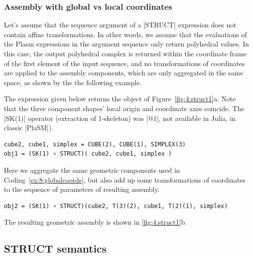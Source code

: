 \begin{coding}
\subsubsection*{Assembly with global vs local coordinates}

Let’s assume that the sequence argument of a |STRUCT| expression
does not contain affine transformations. In other words, we assume
that the evaluations of the Plasm expressions in the argument sequence
only return polyhedral values.
In this case, the output polyhedral complex is returned within the
coordinate frame of the first element of the input sequence, and no
transformations of coordinates are applied to the assembly components,
which are only aggregated in the same space, as shown by the
the following example.

\begin{coding}
The expression given below returns the
object of Figure~\ref{fig:4:struct1}a.  Note that the
three component shapes' local origin and coordinate axes
coincide.  The |SK(1)| operator (extraction of 1-skeleton)
was |$@1$|, not available in Julia, in classic |PlaSM|).
    
\begin{lstlisting}[language=JuliaLocal, style=julia, mathescape=true]
cube2, cube1, simplex = CUBE(2), CUBE(1), SIMPLEX(3)
obj1 = (SK(1) ∘ STRUCT)( cube2, cube1, simplex )
\end{lstlisting}
\label{ex:8:globalcoords}    
\end{coding}


\begin{coding} \label{coding:4:2}
Here we aggregate the same geometric components used in
Coding~\ref{ex:8:globalcoords}, but also add up some
transformations of coordinates to the sequence of parameters of resulting assembly.
\begin{lstlisting}[language=JuliaLocal, style=julia, mathescape=true]
obj2 = (SK(1) ∘ STRUCT)(cube2, T(3)(2), cube1, T(2)(1), simplex)
\end{lstlisting}
\label{ex:8:localcoords}
The resulting geometric assembly is shown in \ref{fig:4:struct1}b.  
\end{coding}


\subsection*{STRUCT semantics}
\label{sec:8:localcoords}


\end{coding}
